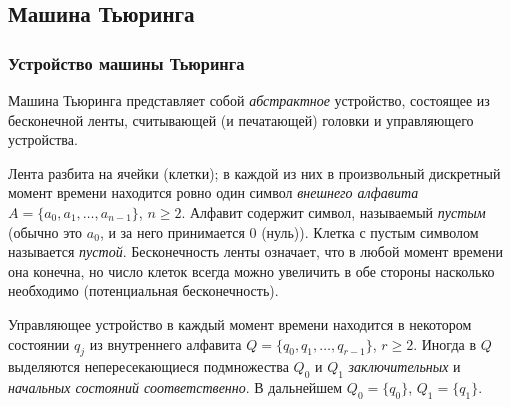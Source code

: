 \subsection{Машина Тьюринга}
\subsubsection{Устройство машины Тьюринга}
Машина Тьюринга представляет собой \textit{абстрактное} устройство, состоящее из бесконечной ленты, считывающей (и печатающей) головки и управляющего устройства.

Лента разбита на ячейки (клетки); в каждой из них в произвольный дискретный момент времени находится ровно один символ \textit{внешнего алфавита} $A = \{a_0, a_1, \dots, a_{n - 1}\}$, $n \geqslant 2$. Алфавит содержит символ, называемый \textit{пустым} (обычно это $a_0$, и за него принимается $0$ (нуль)). Клетка с пустым символом называется \textit{пустой}. Бесконечность ленты означает, что в любой момент времени она конечна, но число клеток всегда можно увеличить в обе стороны насколько необходимо (потенциальная бесконечность).

Управляющее устройство в каждый момент времени находится в некотором состоянии $q_j$ из внутреннего алфавита $Q = \{q_0, q_1, \dots, q_{r - 1}\}$, $r \geqslant 2$. Иногда в $Q$ выделяются непересекающиеся подмножества $Q_0$ и $Q_1$ \textit{заключительных} и \textit{начальных состояний соответственно}. В дальнейшем $Q_0 = \{q_0\}$, $Q_1 = \{q_1\}$.

